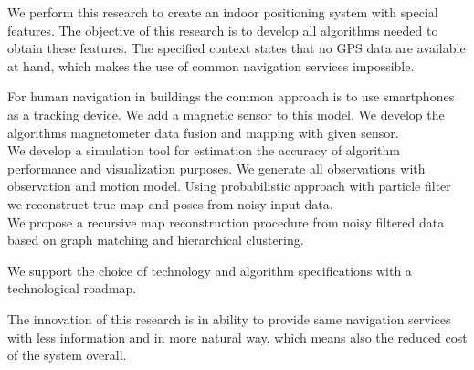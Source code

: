 We perform this research to create an indoor positioning system with special features. The objective of this research is to develop all algorithms needed to obtain these features. The specified context states that no GPS data are available at hand, which makes the use of common navigation services impossible.

For human navigation in buildings the common approach is to use smartphones as a tracking device. We add a magnetic sensor to this model. We develop the algorithms magnetometer data fusion and mapping with given sensor. \\
We develop a simulation tool for estimation the accuracy of algorithm performance and visualization purposes. We generate all observations with observation and motion model. Using probabilistic approach with particle filter we reconstruct true map and poses from noisy input data. \\
We propose a recursive map reconstruction procedure from noisy filtered data based on graph matching and hierarchical clustering.

We support the choice of technology and algorithm specifications with a technological roadmap.

The innovation of this research is in ability to provide same navigation services with less information and in more natural way, which means also the reduced cost of the system overall.
